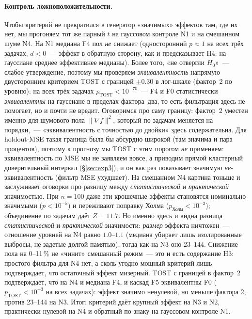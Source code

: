 \documentclass[conference]{IEEEtran}
\begin{document}
\paragraph{Контроль ложноположительности.} Чтобы критерий не превратился
в генератор «значимых» эффектов там, где их нет, мы прогоняем тот же
парный $t$ на гауссовом контроле N1 и на смешанном шуме N4. На N1 медиана
F4 пол \emph{не} снижает (односторонний $p\approx1$ на всех трёх задачах,
$d<0$~--- эффект в обратную сторону, как и предсказывает H4: на гауссиане
среднее эффективнее медианы). Более того, «не отвергли $H_0$»~--- слабое
утверждение, поэтому мы проверяем \emph{эквивалентность} напрямую
двусторонним критерием TOST с границей $\pm0.30$ в лог-шкале (фактор~2 по
уровню): на всех трёх задачах $p_{\text{TOST}}<10^{-70}$~--- F4 и F0
статистически \emph{эквивалентны} на гауссиане в пределах фактора~два,
то есть фильтрация здесь не помогает, но и почти не вредит. Оговоримся про
саму границу: фактор~2 уместен именно для шумового пола $\|\nabla f\|^2$,
который по задачам меняется на порядки,~--- «эквивалентность с точностью до
двойки» здесь содержательна. Для holdout-MSE такая граница была бы абсурдно
широкой (там значима и пара процентов), поэтому к прогнозу мы TOST с этим
порогом \emph{не} применяем: эквивалентность по MSE мы не заявляем вовсе, а
приводим прямой кластерный доверительный интервал (\S\ref{sec:exp3}), и он как
раз показывает значимую \emph{не}-эквивалентность (фильтр MSE ухудшает). На смешанном N4 картина тоньше и заслуживает
оговорки про разницу между \emph{статистической} и \emph{практической}
значимостью. При $n=100$ даже эти крошечные эффекты становятся номинально
значимыми ($p<10^{-5}$) и переживают поправку Холма
($p_{\text{Холм}}<10^{-3}$); объединение по задачам даёт $Z=11.7$. Но
именно здесь и видна разница \emph{статистической} и \emph{практической}
значимости: \emph{размер} эффекта ничтожен~--- отношение уровней на N4
равно $1.0$--$1.1$ (медиана убирает лишь изолированные выбросы, не задетые
долгой памятью), тогда как на N3 оно $23$--$144$. Снижение пола на
0--11\,\% не «чинит» смешанный режим~--- это и есть содержание H3: простого
фильтра для N4 нет, а сколь угодно мощный критерий лишь подтверждает, что
остаточный эффект мизерный. TOST с границей в фактор~2 подтверждает, что на
N4 и медиана F4, и каскад F5 эквивалентны F0 ($p_{\text{TOST}}<10^{-3}$ на
всех задачах): эффект значимо ненулевой, но меньше фактора 2, против
23--144 на N3. Итог: критерий даёт крупный эффект на N3 и N2, практически
нулевой на N4 и обратный по знаку на гауссовом контроле N1.
\end{document}
